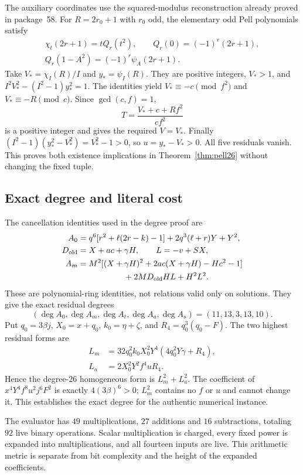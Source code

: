 The auxiliary coordinates use the squared-modulus reconstruction already
proved in package~58. For $R=2r_0+1$ with $r_0$ odd, the elementary odd
Pell polynomials satisfy
\begin{gather*}
 \chi_t(2r+1)=tQ_r(t^2),\qquad Q_r(0)=(-1)^r(2r+1),\\
 Q_r(1-A^2)=(-1)^r\psi_A(2r+1).
\end{gather*}
Take $V_* =\chi_I(R)/I$ and $y_* =\psi_I(R)$. They are positive integers,
$V_*>1$, and $I^2V_*^2-(I^2-1)y_*^2=1$. The identities yield
$V_*\equiv-c\pmod{f^2}$ and $V_*\equiv-R\pmod c$.
Since $\gcd(c,f)=1$,
\[
 T=\frac{V_*+c+Rf^2}{cf^2}
\]
is a positive integer and gives the required $V=V_*$. Finally
$(I^2-1)(y_*^2-V_*^2)=V_*^2-1>0$, so $u=y_*-V_*>0$.
All five residuals vanish. This proves both existence implications in
Theorem~\ref{thm:pell26} without changing the fixed tuple.

\subsection{Exact degree and literal cost}

The cancellation identities used in the degree proof are
\begin{align*}
 A_0={}&q^6[r^2+\ell(2r-k)-1]+2q^3(\ell+r)Y+Y^2,\\
 D_{\rm old}={}&X+ac+\gamma H,\qquad L=-v+SX,\\
 A_m={}&M^2[(X+\gamma H)^2+2ac(X+\gamma H)-Hc^2-1]\\
       &\hspace{15mm}+2MD_{\rm old}HL+H^2L^2.
\end{align*}
These are polynomial-ring identities, not relations valid only on solutions.
They give the exact residual degrees
\[
 (\deg A_0,\deg A_m,\deg A_t,\deg A_a,\deg A_s)
       =(11,13,3,13,10).
\]
Put $q_0=3\beta j$, $X_0=x+q_0$, $k_0=\eta+\zeta$, and
$R_4=q_0^3(q_0-F)$. The two highest residual forms are
\begin{align*}
 L_m&=32q_0^2k_0X_0^2Y^4(4q_0^2Y\gamma+R_4),\\
 L_a&=2X_0^2Y^2f^4uR_4.
\end{align*}
Hence the degree-$26$ homogeneous form is $L_m^2+L_a^2$.
The coefficient of $x^4Y^4f^8u^2j^6F^2$ is exactly $4(3\beta)^6>0$;
$L_m^2$ contains no $f$ or $u$ and cannot change it. This establishes
the exact degree for the authentic numerical instance.

The evaluator has $49$ multiplications, $27$ additions and $16$
subtractions, totaling $92$ live binary operations. Scalar multiplication
is charged, every fixed power is expanded into multiplications, and all
fourteen inputs are live. This arithmetic metric is separate from bit
complexity and the height of the expanded coefficients.

